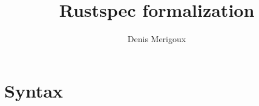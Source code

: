 \documentclass[11pt,a4paper]{article}
\title{Rustspec formalization}
\author{Denis Merigoux}
\begin{document}
\maketitle

\section{Syntax}

\newcommand{\synvar}[1]{\ensuremath{#1}}
\newcommand{\synkeyword}[1]{\textcolor{red!60!black}{\texttt{#1}}}
\newcommand{\synpunct}[1]{\textcolor{black!40!white}{\texttt{#1}}}

\newcommand{\synuse}{\synkeyword{use}\;}
\newcommand{\synconst}{\synkeyword{const}\;}
\newcommand{\syntypalias}{\synkeyword{type}\;}
\newcommand{\synfn}{\synkeyword{fn}\;}
\newcommand{\synbool}{\synkeyword{bool}}
\newcommand{\synint}{\synkeyword{int}}
\newcommand{\synseq}{\synkeyword{Seq}}
\newcommand{\syncopy}{\synkeyword{Copy}}
\newcommand{\synlet}{\synkeyword{let}\;}
\newcommand{\synmut}{\synkeyword{mut}}
\newcommand{\synif}{\synkeyword{if}\;}
\newcommand{\synthen}{\;\synkeyword{then}\;}
\newcommand{\synelse}{\;\synkeyword{else}\;}
\newcommand{\synfor}{\synkeyword{for}\;}
\newcommand{\synin}{\;\synkeyword{in}\;}
\newcommand{\syntrue}{\synkeyword{true}}
\newcommand{\synfalse}{\synkeyword{false}}

\newcommand{\synarraymacro}{\synkeyword{array!}}
\newcommand{\synpolymacro}{\synkeyword{poly!}}

\newcommand{\synsc}{\synpunct{;}}
\newcommand{\syntyped}{\;\synpunct{:}\;}
\newcommand{\syneq}{\;\synpunct{=}\;}
\newcommand{\synlparen}{\synpunct{(}\;}
\newcommand{\synrparen}{\;\synpunct{)}}
\newcommand{\syncomma}{\synpunct{,}\;}
\newcommand{\synref}{\synpunct{\&}}
\newcommand{\synand}{\;\synpunct{\&\&}\;}
\newcommand{\synor}{\;\synpunct{||}\;}
\newcommand{\synnot}{\synpunct{\~}\;}
\newcommand{\synlangle}{\synpunct{<}\;}
\newcommand{\synrangle}{\;\synpunct{>}}
\newcommand{\synlbracket}{\synpunct{\{}\;}
\newcommand{\synrbracket}{\;\synpunct{\}}}
\newcommand{\synarrow}{\;\synpunct{->}\;}
\newcommand{\synrange}{\;\synpunct{..}\;}
\newcommand{\synlsquare}{\synpunct{[}\;}
\newcommand{\synrsquare}{\;\synpunct{]}}

\newcommand{\syndef}{$::=$}
\newcommand{\synalt}{\;$|$\;}


\newcommand{\typctx}[1]{\textcolor{green!50!black}{\ensuremath{#1}}}
\end{document}
